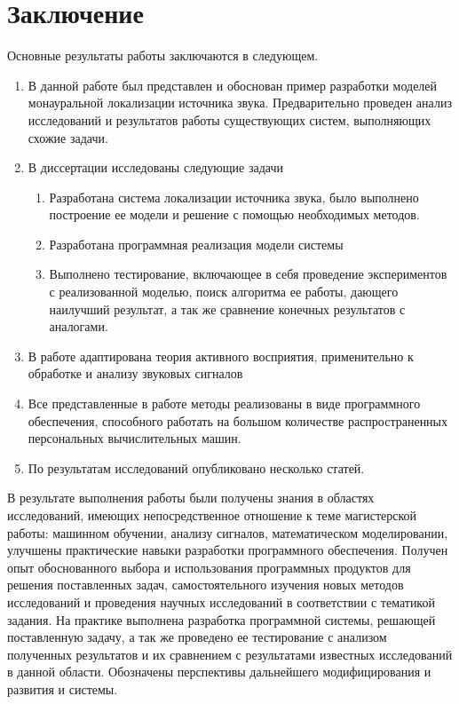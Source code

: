 \chapter*{Заключение}						%

Основные результаты работы заключаются в следующем.
\begin{enumerate}
	
	\item В данной работе был представлен и обоснован пример разработки моделей монауральной локализации источника звука. Предварительно проведен анализ исследований и результатов работы существующих систем, выполняющих схожие задачи.
	
	\item В диссертации исследованы следующие задачи
	
	\begin{enumerate}
		\item Разработана система локализации источника звука, было выполнено построение ее модели и решение с помощью необходимых методов.
		\item Разработана программная реализация модели системы
		\item Выполнено тестирование, включающее в себя проведение экспериментов с реализованной моделью, поиск алгоритма ее работы, дающего наилучший результат, а так же сравнение конечных результатов с аналогами.\\
	\end{enumerate}
	
	  \item В работе адаптирована теория активного восприятия, применительно к обработке и анализу звуковых сигналов
	  
	  \item Все представленные в работе методы реализованы в виде программного обеспечения, способного работать на большом количестве распространенных персональных вычислительных машин.
	  
	  \item По результатам исследований опубликовано несколько статей.
	  
  
\end{enumerate}
В результате выполнения работы были получены знания в областях исследований, имеющих непосредственное отношение к теме магистерской работы: машинном обучении, анализу сигналов, математическом моделировании, улучшены практические навыки разработки программного обеспечения. Получен опыт обоснованного выбора и использования программных продуктов для решения поставленных задач, самостоятельного изучения новых методов исследований и проведения научных исследований в соответствии с тематикой задания. На практике выполнена разработка программной системы, решающей поставленную задачу, а так же проведено ее тестирование с анализом полученных результатов и их сравнением с результатами известных исследований в данной области. Обозначены перспективы дальнейшего модифицирования и развития и системы. 

\clearpage